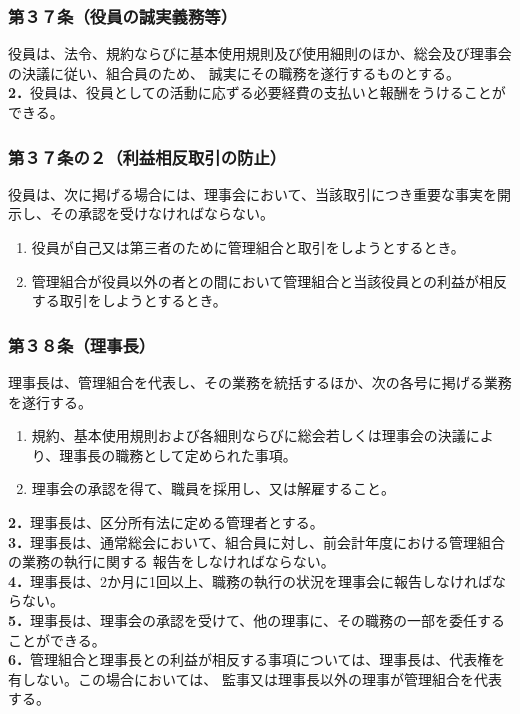 \documentclass[12pt,uplatex,dvipdfmx]{jsarticle}
\begin{document}
\subsubsection*{第３７条（役員の誠実義務等）}
役員は、法令、規約ならびに基本使用規則及び使用細則のほか、総会及び理事会の決議に従い、組合員のため、
誠実にその職務を遂行するものとする。\\
\textbf{2．}役員は、役員としての活動に応ずる必要経費の支払いと報酬をうけることができる。
\subsubsection*{第３７条の２（利益相反取引の防止）}
役員は、次に掲げる場合には、理事会において、当該取引につき重要な事実を開示し、その承認を受けなければならない。
\begin{enumerate}
\item 役員が自己又は第三者のために管理組合と取引をしようとするとき。
\item 管理組合が役員以外の者との間において管理組合と当該役員との利益が相反する取引をしようとするとき。
\end{enumerate}
\subsubsection*{第３８条（理事長）}
理事長は、管理組合を代表し、その業務を統括するほか、次の各号に掲げる業務を遂行する。
\begin{enumerate}
\item 規約、基本使用規則および各細則ならびに総会若しくは理事会の決議により、理事長の職務として定められた事項。
\item 理事会の承認を得て、職員を採用し、又は解雇すること。
\end{enumerate}
\textbf{2．}理事長は、区分所有法に定める管理者とする。\\
\textbf{3．}理事長は、通常総会において、組合員に対し、前会計年度における管理組合の業務の執行に関する
報告をしなければならない。\\
\textbf{4．}理事長は、2か月に1回以上、職務の執行の状況を理事会に報告しなければならない。\\
\textbf{5．}理事長は、理事会の承認を受けて、他の理事に、その職務の一部を委任することができる。\\
\textbf{6．}管理組合と理事長との利益が相反する事項については、理事長は、代表権を有しない。この場合においては、
監事又は理事長以外の理事が管理組合を代表する。
\end{document}
